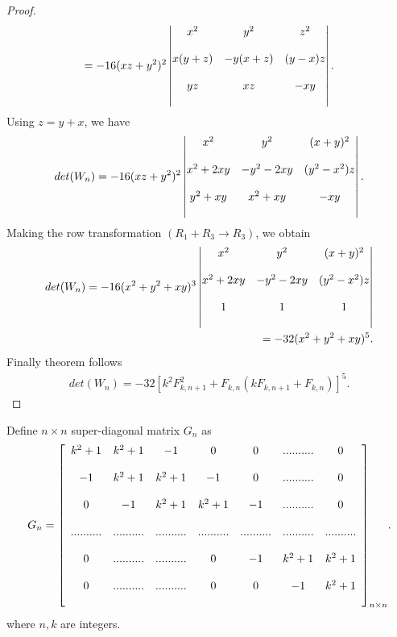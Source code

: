 \begin{proof}
\begin{align*}
= -16(xz+y^2)^2 \begin{vmatrix}
           \bigskip
             x^2& y^2& z^2  \\
             \bigskip
             x(y+z) & -y(x+z) & (y-x) z\\
             \bigskip
             yz&  xz & -xy  \\
\end{vmatrix}.
\end{align*}
Using $z = y+x $, we have
\begin{align*}
det (W_n)= -16(xz+y^2)^2 \begin{vmatrix}
           \bigskip
             x^2& y^2& (x+y)^2  \\
             \bigskip
             x^2+2xy & -y^2-2xy & (y^2-x^2) z\\
             \bigskip
             y^2+xy&  x^2+xy & -xy \\
\end{vmatrix}.
\end{align*}
Making the row transformation $(R_1 + R_3 \rightarrow R_3)$, we obtain
\begin{align*}
det (W_n) = -16(x^2+y^2+xy)^3 \begin{vmatrix}
           \bigskip
             x^2& y^2& (x+y)^2  \\
             \bigskip
             x^2+2xy & -y^2-2xy & (y^2-x^2) z\\
             \bigskip
             1&  1 & 1 \\
\end{vmatrix}\\
= -32 (x^2+y^2 +xy)^5.
\end{align*}
Finally theorem follows
\begin{align*}
det(W_n) = -32 \left[ k^2 F_{k, n+1}^2 + F_{k, n}(k F_{k, n+1}+F_{k, n})\right] ^5.
\end{align*}
\end{proof}
\begin{definition}
Define $n \times n$  super-diagonal matrix $G_n$ as 
\begin{align*}
G_n = {\left[
          \begin{array}{ccccccc}
           \bigskip
            k^2+1 & k^2+1  & -1& 0 &0&..........&0 \\
             \bigskip
           -1 & k^2+1  & k^2+1& -1 &0&..........&0 \\
             \bigskip
           0 & -1  & k^2+1& k^2+1 &-1&..........&0 \\
           \bigskip
            .......... & .......... & ..........& .......... &..........&..........&.......... \\
           \bigskip
            0 & ..........&..........  & 0& -1 &k^2+1&k^2+1\\
            \bigskip
            0 & ..........&..........  & 0& 0 &-1&k^2+1\\
       \end{array}
        \right]_{n \times n}}.
\end{align*}
where  $n, k$ are integers.
\end{definition}
